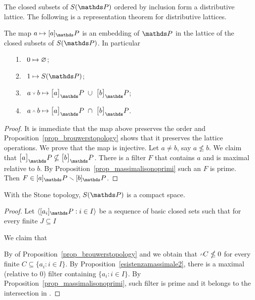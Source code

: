 \documentclass[creche.tex]{subfiles}
\begin{document}
The closed subsets of $S(\PP)$ ordered by inclusion form a distributive lattice. The following is a representation theorem for distributive lattices.

\begin{theorem}
The map $a\mapsto [a]_\PP$ is an embedding of $\PP$ in the lattice of the closed subsets of $S(\PP)$. In particular
\begin{itemize}
\item[1.]\ $0\mapsto \varnothing$;
\item[2.]\ $1\mapsto S(\PP)$;
\item[3.]\ $a\svee b\mapsto \big[a\big]_\PP\ \cup\ \big[b\big]_\PP$;
\item[4.]\ $a\swedge b\mapsto\big[a\big]_\PP\ \cap\ \big[b\big]_\PP$.
\end{itemize}
\end{theorem}

\begin{proof}
It is immediate that the map above preserves the order and Proposition~\ref{prop_brouwerstopology} shows that it preserves the lattice operations. We prove that the map is injective. Let $a\neq b$, say  $a\nleq b$. We claim that $\big[a\big]_\PP\nsubseteq\big[b\big]_\PP$. There is a filter $F$ that contains $a$ and is maximal relative to $b$. By Proposition~\ref{prop_massimalisonoprimi} such an $F$ is prime. Then $F\in [a]_\PP\sm[b]_\PP$. 
\end{proof}


\begin{theorem}\label{thm_reticolocompatto}
With the Stone topology, $S(\PP)$ is a compact space.
\end{theorem}
\begin{proof}
Let $\<[a_i]_\PP:i\in I\>$ be a sequence of basic closed sets such that for every finite $J\subseteq I$


We claim that


By  of Proposition~\ref{prop_brouwerstopology} and  we obtain that $\swedge C\nleq 0$ for every finite $C\subseteq \{a_i:i\in I\}$. By Proposition~\ref{esistenzamassimale2}, there is a maximal (relative to $0$) filter containing $\{a_i:i\in I\}$. By Proposition~\ref{prop_massimalisonoprimi}, such filter is prime and it belongs to the intersection in .
\end{proof}
\end{document}

